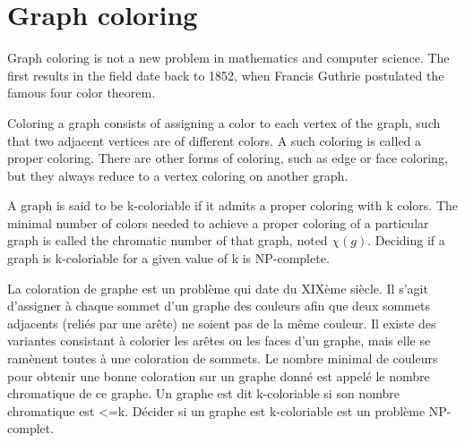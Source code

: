 \section{Graph coloring}

Graph coloring is not a new problem in mathematics and computer science. The first results in the field date back to 1852, when Francis Guthrie postulated the famous four color theorem.

Coloring a graph consists of assigning a color to each vertex of the graph, such that two adjacent vertices are of different colors. A such coloring is called a proper coloring. There are other forms of coloring, such as edge or face coloring, but they always reduce to a vertex coloring on another graph.

 A graph is said to be k-coloriable if it admits a proper coloring with k colors. The minimal number of colors needed to achieve a proper coloring of a particular graph is called the chromatic number of that graph, noted $ \chi (g)$. Deciding if a graph is k-coloriable for a given value of k is NP-complete.


La coloration de graphe est un problème qui date du XIXème siècle.
Il s'agit d'assigner à chaque sommet d'un graphe des couleurs afin que deux sommets adjacents (reliés par une arête) ne soient pas de la même couleur. Il existe des variantes consistant à colorier les arêtes ou les faces d'un graphe, mais elle se ramènent toutes à une coloration de sommets. Le nombre minimal de couleurs pour obtenir une bonne coloration sur un graphe donné est appelé le nombre chromatique de ce graphe. Un graphe est dit k-coloriable si son nombre chromatique est <=k. Décider si un graphe est k-coloriable est un problème NP-complet.
